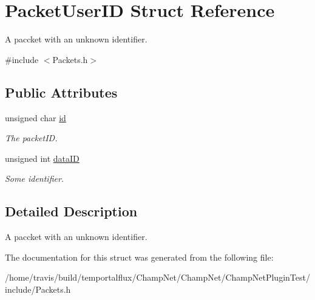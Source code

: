 \hypertarget{struct_packet_user_i_d}{\section{Packet\-User\-I\-D Struct Reference}
\label{struct_packet_user_i_d}
}


A paccket with an unknown identifier.  




{\ttfamily \#include $<$Packets.\-h$>$}

\subsection*{Public Attributes}
\begin{DoxyCompactItemize}
\item 
\hypertarget{struct_packet_user_i_d_a1576d84ee490095dbc4bc61767c2380c}{unsigned char \hyperlink{struct_packet_user_i_d_a1576d84ee490095dbc4bc61767c2380c}{id}}\label{struct_packet_user_i_d_a1576d84ee490095dbc4bc61767c2380c}

\begin{DoxyCompactList}\small\item\em The packet\-I\-D. \end{DoxyCompactList}\item 
\hypertarget{struct_packet_user_i_d_a03b964528b57e0006c42e8e079083407}{unsigned int \hyperlink{struct_packet_user_i_d_a03b964528b57e0006c42e8e079083407}{data\-I\-D}}\label{struct_packet_user_i_d_a03b964528b57e0006c42e8e079083407}

\begin{DoxyCompactList}\small\item\em Some identifier. \end{DoxyCompactList}\end{DoxyCompactItemize}


\subsection{Detailed Description}
A paccket with an unknown identifier. 

The documentation for this struct was generated from the following file\-:\begin{DoxyCompactItemize}
\item 
/home/travis/build/temportalflux/\-Champ\-Net/\-Champ\-Net/\-Champ\-Net\-Plugin\-Test/include/Packets.\-h\end{DoxyCompactItemize}
